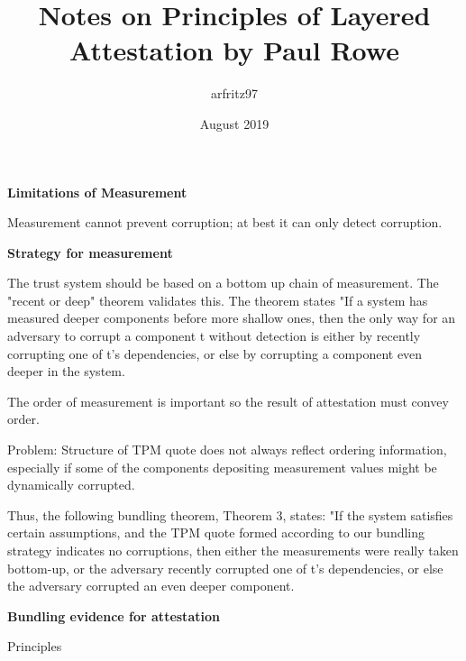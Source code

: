 \documentclass{article}
\title{Notes on Principles of Layered Attestation by Paul Rowe}
\author{arfritz97 }
\date{August 2019}
\begin{document}
\textbf {Limitations of Measurement}

Measurement cannot prevent corruption; at best it can only detect corruption.

\textbf {Strategy for measurement}

The trust system should be based on a bottom up chain of measurement. The "recent or deep" theorem validates this. The theorem states "If a system has measured deeper components before more shallow ones, then the only way for an adversary to corrupt a component t without detection is either by recently corrupting one of t's dependencies, or else by corrupting a component even deeper in the system. 


The order of measurement is important so the result of attestation must convey order. 

Problem: Structure of TPM quote does not always reflect ordering information, especially if some of the components depositing measurement values might be dynamically corrupted. 

Thus, the following bundling theorem, Theorem 3, states: "If the system satisfies certain assumptions, and the TPM quote formed according to our bundling strategy indicates no corruptions, then either the measurements were really taken bottom-up, or the adversary recently corrupted one of t's dependencies, or else the adversary corrupted an even deeper component.

\textbf {Bundling evidence for attestation}

Principles
\end{document}
